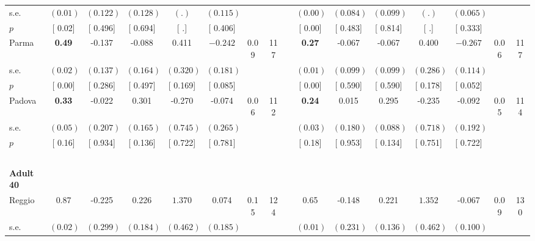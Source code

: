 \begin{longtable}{L{8em} c c c c c c c p{1em} c c c c c c c}
\quad \quad \quad \quad s.e.& $ (     0.01)$ & $ (    0.122)$ & $ (    0.128)$ & $ (        .)$ & $ (    0.115)$ & & & & $ (     0.00)$ & $ (    0.084)$ & $ (    0.099)$ & $ (        .)$ & $ (    0.065)$ & &  \\*
\quad \quad \quad \quad $ p$ & [     0.02] & [    0.496] & [    0.694] & [        .] & [    0.406] & & & & [     0.00] & [    0.483] & [    0.814] & [        .] & [    0.333] & &  \\[1em]
\quad \quad \quad Parma& \textbf{     0.49} &    -0.137 &    -0.088 &     0.411 & $ \mathbf{   -0.242}$ &      0.09 &       117 & & \textbf{     0.27} &    -0.067 &    -0.067 &     0.400 & $ \mathbf{   -0.267}$ &      0.06 &       117  \\*
\quad \quad \quad \quad s.e.& $ (     0.02)$ & $ (    0.137)$ & $ (    0.164)$ & $ (    0.320)$ & $ (    0.181)$ & & & & $ (     0.01)$ & $ (    0.099)$ & $ (    0.099)$ & $ (    0.286)$ & $ (    0.114)$ & &  \\*
\quad \quad \quad \quad $ p$ & [     0.00] & [    0.286] & [    0.497] & [    0.169] & [    0.085] & & & & [     0.00] & [    0.590] & [    0.590] & [    0.178] & [    0.052] & &  \\[1em]
\quad \quad \quad Padova& \textbf{     0.33} &    -0.022 &     0.301 &    -0.270 &    -0.074 &      0.06 &       112 & & \textbf{     0.24} &     0.015 &     0.295 &    -0.235 &    -0.092 &      0.05 &       114  \\*
\quad \quad \quad \quad s.e.& $ (     0.05)$ & $ (    0.207)$ & $ (    0.165)$ & $ (    0.745)$ & $ (    0.265)$ & & & & $ (     0.03)$ & $ (    0.180)$ & $ (    0.088)$ & $ (    0.718)$ & $ (    0.192)$ & &  \\*
\quad \quad \quad \quad $ p$ & [     0.16] & [    0.934] & [    0.136] & [    0.722] & [    0.781] & & & & [     0.18] & [    0.953] & [    0.134] & [    0.751] & [    0.722] & &  \\[1em]
~\\[1em]
\quad \quad \textbf{Adult 40} & & & & & & & & & & & & & & & \\* 
\quad \quad \quad Reggio& 0.87 &    -0.225 &     0.226 & $ \mathbf{    1.370}$ &     0.074 &      0.15 &       124 & & 0.65 &    -0.148 &     0.221 & $ \mathbf{    1.352}$ &    -0.067 &      0.09 &       130  \\*
\quad \quad \quad \quad s.e.& $ (     0.02)$ & $ (    0.299)$ & $ (    0.184)$ & $ (    0.462)$ & $ (    0.185)$ & & & & $ (     0.01)$ & $ (    0.231)$ & $ (    0.136)$ & $ (    0.462)$ & $ (    0.100)$ & &  \\*

\end{longtable}
